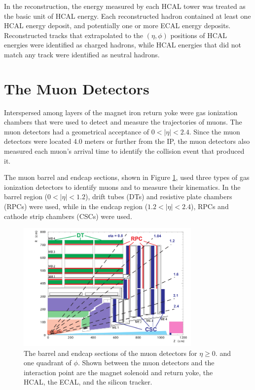 In the reconstruction, the energy measured by each HCAL tower was treated as the basic unit of HCAL energy.  
Each reconstructed hadron contained at least one HCAL energy deposit, and potentially one or more ECAL energy 
deposits.  Reconstructed tracks that extrapolated to the $(\eta,\phi)$ positions of HCAL energies were identified 
as charged hadrons, while HCAL energies that did not match any track were identified as neutral hadrons.


\section{The Muon Detectors}
\label{sec:muonDetectorsDescription}
Interspersed among layers of the magnet iron return yoke were gas ionization chambers that were used to detect and measure the 
trajectories of muons.  The muon detectors had a geometrical acceptance of $0 < |\eta| < 2.4$.  Since the muon detectors were 
located 4.0 meters or further from the IP, the muon detectors also measured each muon's arrival time to identify the collision 
event that produced it.

The muon barrel and endcap sections, shown in Figure \ref{fig:muonBarrelAndEndcapDetectors}, used three types of gas ionization 
detectors to identify muons and to measure their kinematics.  In the barrel region ($0 < |\eta| < 1.2$), drift tubes (DTs) and 
resistive plate chambers (RPCs) were used, while in the endcap region ($1.2 < |\eta| < 2.4$), RPCs and cathode strip chambers 
(CSCs) were used.

\begin{figure}[ht]
	\centering
	\includegraphics[width=0.8\textwidth]{figures/muonDetectorLayout.png}
	\caption{The barrel and endcap sections of the muon detectors for $\eta \geq 0.$ and one quadrant of $\phi$.  Shown 
		between the muon detectors and the interaction point are the magnet solenoid and return yoke, the HCAL, the ECAL, 
		and the silicon tracker.}
	\label{fig:muonBarrelAndEndcapDetectors}
\end{figure}

